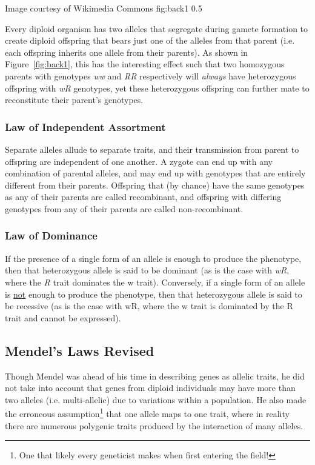 	{Image courtesy of Wikimedia Commons}
	{fig:back1}
	{0.5}

Every diploid organism has two alleles that segregate during gamete formation to create diploid offspring that bears just one of the alleles from that parent (i.e. each offspring inherits one allele from their parents). As shown in Figure~\ref{fig:back1}, this has the interesting effect such that two homozygous parents with genotypes \textit{ww} and \textit{RR} respectively will \textit{always} have heterozygous offspring with \textit{wR} genotypes, yet these heterozygous offspring can further mate to reconstitute their parent's genotypes.


\subsubsection{Law of Independent Assortment}

Separate alleles allude to separate traits, and their transmission from parent to offspring are independent of one another. A zygote can end up with any combination of parental alleles, and may end up with genotypes that are entirely different from their parents. Offspring that (by chance) have the same genotypes as any of their parents are called \gls{recombinant}, and offspring with differing genotypes from any of their parents are called \gls{non-recombinant}.

\subsubsection{Law of Dominance}

If the presence of a single form of an allele is enough to produce the phenotype, then that heterozygous allele is said to be \gls{dominant} (as is the case with \textit{wR}, where the \textit{R} trait dominates the w trait). Conversely, if a single form of an allele is \underline{not} enough to produce the phenotype, then that heterozygous allele is said to be \gls{recessive} (as is the case with wR, where the w trait is dominated by the R trait and cannot be expressed).


\subsection{Mendel's Laws Revised}

Though Mendel was ahead of his time in describing genes as allelic traits, he did not take into account that genes from diploid individuals may have more than two alleles (i.e. \gls{multi-allelic}) due to variations within a population.  He also made the erroneous assumption\footnote{One that likely every geneticist makes when first entering the field!} that one allele maps to one trait, where in reality there are numerous \gls{polygenic traits} produced by the interaction of many alleles. 

